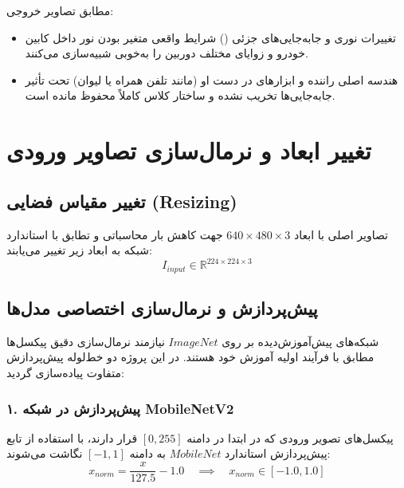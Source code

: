 \documentclass{report}
\begin{document}
 	مطابق تصاویر خروجی:
 	\begin{itemize}
 		\item تغییرات نوری و جابه‌جایی‌های جزئی () شرایط واقعی متغیر بودن نور داخل کابین خودرو و زوایای مختلف دوربین را به‌خوبی شبیه‌سازی می‌کنند.
 		\item هندسه اصلی راننده و ابزارهای در دست او (مانند تلفن همراه یا لیوان) تحت تأثیر جابه‌جایی‌ها تخریب نشده و ساختار کلاس کاملاً محفوظ مانده است.
 	\end{itemize}
 	
 	
 	
 	
 	
 	\section{تغییر ابعاد و نرمال‌سازی تصاویر ورودی}
 	
 	\subsection{تغییر مقیاس فضایی (Resizing)}
 	تصاویر اصلی با ابعاد $640 \times 480 \times 3$ جهت کاهش بار محاسباتی و تطابق با استاندارد شبکه به ابعاد زیر تغییر می‌یابند:
 	\begin{equation}
 		I_{input} \in \mathbb{R}^{224 \times 224 \times 3}
 	\end{equation}
 	
 	\subsection{پیش‌پردازش و نرمال‌سازی اختصاصی مدل‌ها}
 	شبکه‌های پیش‌آموزش‌دیده بر روی $ImageNet$ نیازمند نرمال‌سازی دقیق پیکسل‌ها مطابق با فرآیند اولیه آموزش خود هستند. در این پروژه دو خط‌لوله پیش‌پردازش متفاوت پیاده‌سازی گردید:
 	
 	\subsubsection{۱. پیش‌پردازش در شبکه MobileNetV2}
 	پیکسل‌های تصویر ورودی که در ابتدا در دامنه $[0, 255]$ قرار دارند، با استفاده از تابع پیش‌پردازش استاندارد $MobileNet$ به دامنه $[-1, 1]$ نگاشت می‌شوند:
 	\begin{equation}
 		x_{norm} = \frac{x}{127.5} - 1.0 \quad \implies \quad x_{norm} \in [-1.0, 1.0]
 	\end{equation}
 	
\end{document}
